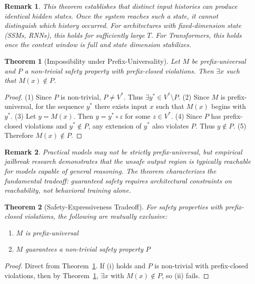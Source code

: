 \documentclass[11pt,a4paper]{article}
\newtheorem{theorem}{Theorem}[section]
\newtheorem*{remark}{Remark}
\begin{document}
\begin{remark}
This theorem establishes that distinct input histories can produce identical hidden states. Once the system reaches such a state, it cannot distinguish which history occurred. For architectures with fixed-dimension state (SSMs, RNNs), this holds for sufficiently large $T$. For Transformers, this holds once the context window is full and state dimension stabilizes.
\end{remark}

\begin{theorem}[Impossibility under Prefix-Universality]
\label{thm:impossibility}
Let $M$ be prefix-universal and $P$ a non-trivial safety property with prefix-closed violations. Then $\exists x$ such that $M(x) \notin P$.
\end{theorem}

\begin{proof}
(1) Since $P$ is non-trivial, $P \neq V^*$. Thus $\exists y^* \in V^* \setminus P$. (2) Since $M$ is prefix-universal, for the sequence $y^*$ there exists input $x$ such that $M(x)$ begins with $y^*$. (3) Let $y = M(x)$. Then $y = y^* \circ z$ for some $z \in V^*$. (4) Since $P$ has prefix-closed violations and $y^* \notin P$, any extension of $y^*$ also violates $P$. Thus $y \notin P$. (5) Therefore $M(x) \notin P$.
\end{proof}

\begin{remark}
Practical models may not be strictly prefix-universal, but empirical jailbreak research demonstrates that the unsafe output region is typically reachable for models capable of general reasoning. The theorem characterizes the fundamental tradeoff: guaranteed safety requires architectural constraints on reachability, not behavioral training alone.
\end{remark}

\begin{theorem}[Safety-Expressiveness Tradeoff]
\label{thm:tradeoff}
For safety properties with prefix-closed violations, the following are mutually exclusive:
\begin{enumerate}
    \item[(i)] $M$ is prefix-universal
    \item[(ii)] $M$ guarantees a non-trivial safety property $P$
\end{enumerate}
\end{theorem}

\begin{proof}
Direct from Theorem~\ref{thm:impossibility}. If (i) holds and $P$ is non-trivial with prefix-closed violations, then by Theorem~\ref{thm:impossibility}, $\exists x$ with $M(x) \notin P$, so (ii) fails.
\end{proof}
\end{document}

